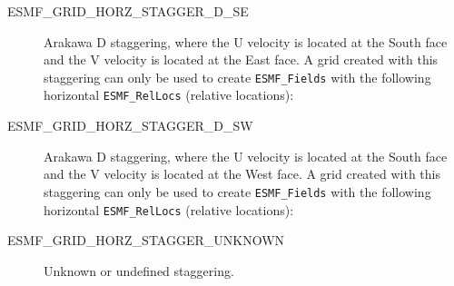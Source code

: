 \begin{description}
    \item [ESMF\_GRID\_HORZ\_STAGGER\_D\_SE]
          Arakawa D staggering, where the U velocity is located at the South face
          and the V velocity is located at the East face.  A grid created with
          this staggering can only be used to create {\tt ESMF\_Fields} with the
          following horizontal {\tt ESMF\_RelLocs} (relative locations):
 
    \item [ESMF\_GRID\_HORZ\_STAGGER\_D\_SW]
          Arakawa D staggering, where the U velocity is located at the South face
          and the V velocity is located at the West face.  A grid created with
          this staggering can only be used to create {\tt ESMF\_Fields} with the
          following horizontal {\tt ESMF\_RelLocs} (relative locations):


    \item [ESMF\_GRID\_HORZ\_STAGGER\_UNKNOWN]
          Unknown or undefined staggering.

 \end{description}


% 
% 


